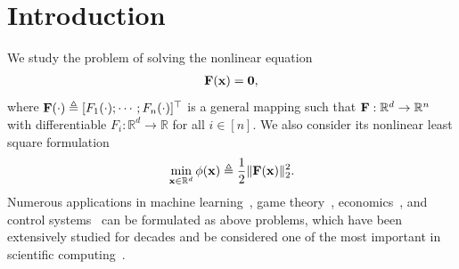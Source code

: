 \documentclass[11pt]{article}
\theoremstyle{plain}
\theoremstyle{definition}
\theoremstyle{remark}
\theoremstyle{plain}
\def\F{{\bf F}}
\def\x{{\bf x}}
\def\0{{\bf 0}}
\def\RB{{\mathbb R}}
\begin{document}
\section{Introduction}
We study the problem of solving the nonlinear equation
\begin{align}\label{eq:nonlinear_obj}
    \F(\x) = \0,
\end{align}
where $\F(\cdot)\triangleq [F_1(\cdot);\cdots;F_n(\cdot)]^{\top}$ is a general mapping such that $\F:\RB^{d}\to\RB^n$ with differentiable $F_i:\RB^d\to\RB$ for all $i\in[n]$. 
We also consider its nonlinear least square formulation
\begin{align}
    \label{eq:nonlinear_least_obj}
    \min_{\x\in\RB^d} \phi(\x)\triangleq\frac{1}{2}\|\F(\x)\|_2^2.
\end{align}
Numerous applications in machine learning~\citep{scieur2018nonlinear,alizamir2020comparative,song2021accelerating}, game theory~\citep{frehse1984nonlinear,nourian2013e}, economics~\citep{albu2006non}, and control systems~\citep{more1989collection,berthier2021fast} can be formulated as above problems, which have been extensively studied for decades and be considered one of the most important in scientific computing~\citep{nesterov2007modified}.
\end{document}
